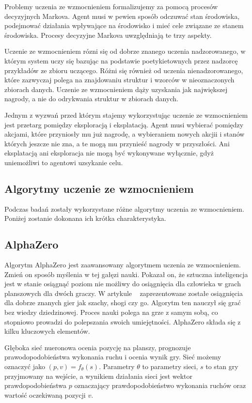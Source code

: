 Problemy uczenia ze wzmocnieniem formalizujemy za pomocą procesów decyzyjnych Markova.
Agent musi w pewien sposób odczuwać stan środowiska, podejmować działania wpływające na środowisko 
i mieć cele związane ze stanem środowiska. Procesy decyzyjne Markova uwzględniają te trzy aspekty.

Uczenie ze wzmocnieniem rózni się od dobrze znanego uczenia nadzorowanego, w którym system uczy 
się bazując na podstawie poetykietownych przez nadzorcę przykładów ze zbioru uczącego.
Różni się również od uczenia nienadzorowanego, które zazwyczaj polega na znajdowaniu 
struktur i wzorców w nieoznaczonych zbiorach danych. Uczenie ze wzmocnieniem dąży 
uzyskania jak największej nagrody, a nie do odrykwania struktur w zbiorach danych.

Jednym z wyzwań przed którym stajemy wykorzystując uczenie ze wzmocnieniem jest przetarg 
pomiędzy eksploracją i eksplatacją. Agent musi wybierać pomiędzy akcjami, które przyniosły mu już 
nagrodę, a wybieraniem nowych akcjii i stanów których jeszcze nie zna, a te mogą mu przynieść 
nagrody w przyszłości. Ani eksplatacją ani eksploracja nie mogą być wykonywane wyłącznie,
gdyż uniemożliwi to agentowi uzsykanie celu.

\subsection{Algorytmy uczenie ze wzmocnieniem}
Podczas badań zostały wykorzystane różne algorytmy uczenia ze wzmocnieniem. Poniżej zostanie dokonana
ich krótka charakterystyka.

\subsection*{AlphaZero}
Algorytm AlphaZero jest zaawansowany algorytmem uczenia ze wzmocnieniem. Zmień on sposób myślenia 
w tej gałęzi nauki. Pokazał on, że sztuczna inteligencja jest w stanie osiągnąć poziom nie możliwy do 
osiągnięcia dla człowieka w grach planszowych dla dwóch graczy. W artykule ~\cite{alpha_zero} zaprezentowane
zostałe osiągnięcia dla dobrze znanych gier jak szachy, shogi czy go. Algorytm ten nauczył się grać bez 
wiedzy dziedzinowej. Proces nauki polega na grze z samym sobą, co stopniowo prowadzi do polepszania 
swoich umiejętności. AlphaZero składa się z kilku kluczowych elementów.

Głęboka sieć nueronowa ocenia pozycję na planszy, prognozuje prawodopodobieństwa wykonania ruchu i ocenia wynik gry.
Sieć możemy oznaczyć jako $(p,v)=f_{\theta}(s)$. Parametry $\theta$ to parametry sieci, $s$ to stan gry przyjmowany na wejście,
a wynikiem działania sieci jest wektor prawdopodobieństwa $p$ oznaczający prawdopodobieństwo wykonania ruchów oraz 
wartość oczekiwaną pozycji $v$.

